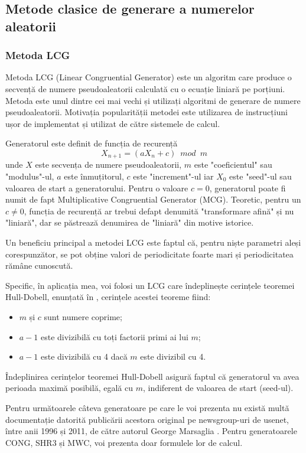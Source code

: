 \subsection{Metode clasice de generare a numerelor aleatorii}

\subsubsection{Metoda LCG}

Metoda LCG (Linear Congruential Generator) este un algoritm care produce o secvență de numere pseudoaleatorii calculată cu o ecuație liniară pe porțiuni. Metoda este unul dintre cei mai vechi și utilizați algoritmi de generare de numere pseudoaleatorii. Motivația popularității metodei este utilizarea de instrucțiuni ușor de implementat și utilizat de către sistemele de calcul. 

Generatorul este definit de funcția de recurență 
\[
X_{n+1} = (aX_n + c) \enspace mod \enspace m
\]
unde $X$ este secvența de numere pseudoaleatorii, $m$ este "coeficientul" sau "modulus"-ul, $a$ este înmuțitorul, $c$ este "increment"-ul iar $X_0$ este "seed"-ul sau valoarea de start a generatorului. Pentru o valoare $c = 0$, generatorul poate fi numit de fapt Multiplicative Congruential Generator (MCG). Teoretic, pentru un $c \neq 0$, funcția de recurență ar trebui defapt denumită "transformare afină" și nu "liniară", dar se păstrează denumirea de "liniară" din motive istorice.

Un beneficiu principal a metodei LCG este faptul că, pentru niște parametri aleși corespunzător, se pot obține valori de periodicitate foarte mari și periodicitatea rămâne cunoscută. 

Specific, în aplicația mea, voi folosi un LCG care îndeplinește cerințele teoremei Hull-Dobell, enunțată în \cite{HullDobellRNGs}, cerințele acestei teoreme fiind:
\begin{itemize}
    \item $m$ și $c$ sunt numere coprime;
    \item $a-1$ este divizibilă cu toți factorii primi ai lui $m$;
    \item $a-1$ este divizibilă cu 4 dacă $m$ este divizibil cu 4.
\end{itemize}

Îndeplinirea cerințelor teoremei Hull-Dobell asigură faptul că generatorul va avea perioada maximă posibilă, egală cu $m$, indiferent de valoarea de start (seed-ul). 


Pentru următoarele câteva generatoare pe care le voi prezenta nu există multă documentație datorită publicării acestora original pe newsgroup-uri de usenet, între anii 1996 și 2011, de către autorul George Marsaglia \cite{misc:usenet:GeorgeMarsaglia}. Pentru generatoarele CONG, SHR3 și MWC, voi prezenta doar formulele lor de calcul. 

